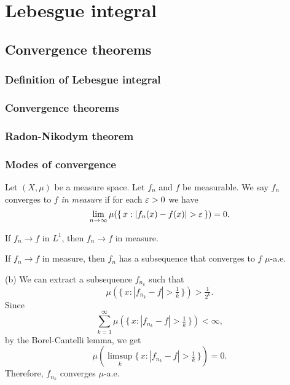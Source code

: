 \documentclass{../note}
\begin{document}
\part{Lebesgue integral}


\chapter{Convergence theorems}
\section{Definition of Lebesgue integral}
\section{Convergence theorems}

\begin{prb}
\end{prb}




\section{Radon-Nikodym theorem}


\section{Modes of convergence}

\begin{prb}
\end{prb}

\begin{prb}
Let $(X,\mu)$ be a measure space.
Let $f_n$ and $f$ be measurable.
We say $f_n$ converges to $f$ \emph{in measure} if for each $\varepsilon>0$ we have
\[\lim_{n\to\infty}\mu(\{\,x:|f_n(x)-f(x)|>\e\,\})=0.\]
\begin{parts}
\item If $f_n\to f$ in $L^1$, then $f_n\to f$ in measure.
\item If $f_n\to f$ in measure, then $f_n$ has a subsequence that converges to $f$ $\mu$-a.e.
\end{parts}
\end{prb}
\begin{pf}
(b)
We can extract a subsequence $f_{n_k}$ such that
\[\mu(\{\,x:|f_{n_k}-f|>\tfrac1k\,\})>\tfrac1{2^k}.\]
Since
\[\sum_{k=1}^\infty\mu(\{\,x:|f_{n_k}-f|>\tfrac1k\,\})<\infty,\]
by the Borel-Cantelli lemma, we get
\[\mu(\limsup_k\{\,x:|f_{n_k}-f|>\tfrac1k\,\})=0.\]
Therefore, $f_{n_k}$ converges $\mu$-a.e.
\end{pf}
\end{document}
